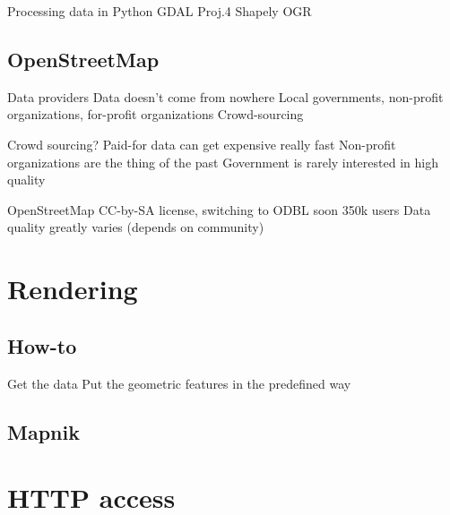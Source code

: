\documentclass{beamer}
\begin{document}
\begin{frame}{Processing data in Python}
  GDAL
  Proj.4
  Shapely
  OGR
\end{frame}


\subsection{OpenStreetMap}

\begin{frame}{Data providers}
  Data doesn't come from nowhere
  Local governments, non-profit organizations, for-profit organizations
Crowd-sourcing
\end{frame}

\begin{frame}{Crowd sourcing?}
  Paid-for data can get expensive really fast
  Non-profit organizations are the thing of the past
  Government is rarely interested in high quality
\end{frame}

\begin{frame}{OpenStreetMap}
  CC-by-SA license, switching to ODBL soon
  350k users
  Data quality greatly varies (depends on community)
\end{frame}

\section{Rendering}

\subsection{How-to}

\begin{frame}{}
  Get the data
  Put the geometric features in the predefined way

\end{frame}

\subsection{Mapnik}

\begin{frame}{}

\end{frame}


\section{HTTP access}
\end{document}
